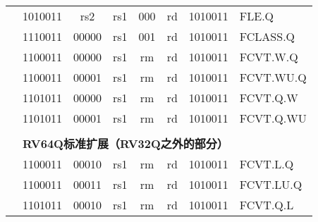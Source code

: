 \begin{table}[p]
\begin{small}
\begin{center}
\begin{tabular}{p{0in}p{0.4in}p{0.05in}p{0.05in}p{0.05in}p{0.05in}p{0.4in}p{0.6in}p{0.4in}p{0.6in}p{0.7in}l}
&
\multicolumn{4}{|c|}{1010011} &
\multicolumn{2}{c|}{rs2} &
\multicolumn{1}{c|}{rs1} &
\multicolumn{1}{c|}{000} &
\multicolumn{1}{c|}{rd} &
\multicolumn{1}{c|}{1010011} & FLE.Q \\
\cline{2-11}


&
\multicolumn{4}{|c|}{1110011} &
\multicolumn{2}{c|}{00000} &
\multicolumn{1}{c|}{rs1} &
\multicolumn{1}{c|}{001} &
\multicolumn{1}{c|}{rd} &
\multicolumn{1}{c|}{1010011} & FCLASS.Q \\
\cline{2-11}


&
\multicolumn{4}{|c|}{1100011} &
\multicolumn{2}{c|}{00000} &
\multicolumn{1}{c|}{rs1} &
\multicolumn{1}{c|}{rm} &
\multicolumn{1}{c|}{rd} &
\multicolumn{1}{c|}{1010011} & FCVT.W.Q \\
\cline{2-11}


&
\multicolumn{4}{|c|}{1100011} &
\multicolumn{2}{c|}{00001} &
\multicolumn{1}{c|}{rs1} &
\multicolumn{1}{c|}{rm} &
\multicolumn{1}{c|}{rd} &
\multicolumn{1}{c|}{1010011} & FCVT.WU.Q \\
\cline{2-11}


&
\multicolumn{4}{|c|}{1101011} &
\multicolumn{2}{c|}{00000} &
\multicolumn{1}{c|}{rs1} &
\multicolumn{1}{c|}{rm} &
\multicolumn{1}{c|}{rd} &
\multicolumn{1}{c|}{1010011} & FCVT.Q.W \\
\cline{2-11}


&
\multicolumn{4}{|c|}{1101011} &
\multicolumn{2}{c|}{00001} &
\multicolumn{1}{c|}{rs1} &
\multicolumn{1}{c|}{rm} &
\multicolumn{1}{c|}{rd} &
\multicolumn{1}{c|}{1010011} & FCVT.Q.WU \\
\cline{2-11}


&
\multicolumn{10}{c}{} & \\
&
\multicolumn{10}{c}{\bf RV64Q标准扩展（RV32Q之外的部分）} & \\
\cline{2-11}


&
\multicolumn{4}{|c|}{1100011} &
\multicolumn{2}{c|}{00010} &
\multicolumn{1}{c|}{rs1} &
\multicolumn{1}{c|}{rm} &
\multicolumn{1}{c|}{rd} &
\multicolumn{1}{c|}{1010011} & FCVT.L.Q \\
\cline{2-11}


&
\multicolumn{4}{|c|}{1100011} &
\multicolumn{2}{c|}{00011} &
\multicolumn{1}{c|}{rs1} &
\multicolumn{1}{c|}{rm} &
\multicolumn{1}{c|}{rd} &
\multicolumn{1}{c|}{1010011} & FCVT.LU.Q \\
\cline{2-11}


&
\multicolumn{4}{|c|}{1101011} &
\multicolumn{2}{c|}{00010} &
\multicolumn{1}{c|}{rs1} &
\multicolumn{1}{c|}{rm} &
\multicolumn{1}{c|}{rd} &
\multicolumn{1}{c|}{1010011} & FCVT.Q.L \\
\cline{2-11}



\end{tabular}
\end{center}
\end{small}
\end{table}
